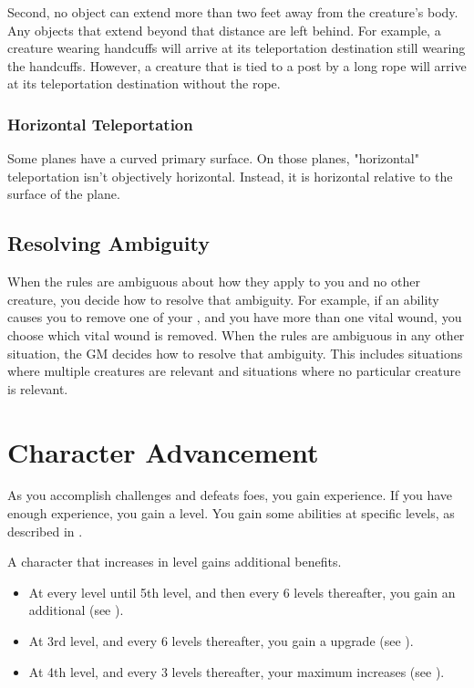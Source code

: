             Second, no object can extend more than two feet away from the creature's body.
            Any objects that extend beyond that distance are left behind.
            For example, a creature wearing handcuffs will arrive at its teleportation destination still wearing the handcuffs.
            However, a creature that is tied to a post by a long rope will arrive at its teleportation destination without the rope.

        \subsubsection{Horizontal Teleportation}
            Some planes have a curved primary surface.
            On those planes, "horizontal" teleportation isn't objectively horizontal.
            Instead, it is horizontal relative to the surface of the plane.

    \subsection{Resolving Ambiguity}\label{Resolving Ambiguity}
        When the rules are ambiguous about how they apply to you and no other creature, you decide how to resolve that ambiguity.
        For example, if an ability causes you to remove one of your , and you have more than one vital wound, you choose which vital wound is removed.
        When the rules are ambiguous in any other situation, the GM decides how to resolve that ambiguity.
        This includes situations where multiple creatures are relevant and situations where no particular creature is relevant.

\section{Character Advancement}\label{Character Advancement}

    As you accomplish challenges and defeats foes, you gain experience.
    If you have enough experience, you gain a level.
    You gain some abilities at specific levels, as described in .

    A character that increases in level gains additional benefits.
    \begin{itemize}
        \item At every level until 5th level, and then every 6 levels thereafter, you gain an additional  (see ).
        \item At 3rd level, and every 6 levels thereafter, you gain a  upgrade (see ).
        \item At 4th level, and every 3 levels thereafter, your maximum  increases (see ).
    \end{itemize}

